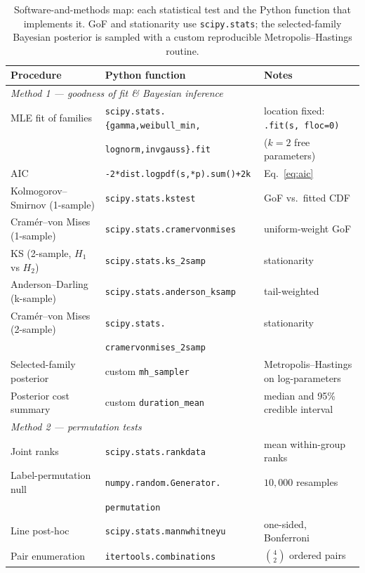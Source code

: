 \documentclass[11pt,a4paper]{article}
\begin{document}
\begin{table}[H]\centering\small\setlength{\tabcolsep}{4pt}
\begin{tabular}{@{}p{3.4cm}p{5.9cm}p{4.8cm}@{}}
\toprule
Procedure & Python function & Notes \\
\midrule
\multicolumn{3}{l}{\textit{Method 1 --- goodness of fit \& Bayesian inference}}\\
MLE fit of families & \texttt{scipy.stats.\{gamma,weibull\_min,} & location fixed: \texttt{.fit(s, floc=0)}\\
                    & \texttt{lognorm,invgauss\}.fit} & ($k=2$ free parameters)\\
AIC                 & \texttt{-2*dist.logpdf(s,*p).sum()+2k} & Eq.~\eqref{eq:aic}\\
Kolmogorov--Smirnov (1-sample) & \texttt{scipy.stats.kstest} & GoF vs.\ fitted CDF\\
Cram\'er--von Mises (1-sample)  & \texttt{scipy.stats.cramervonmises} & uniform-weight GoF\\
KS (2-sample, $H_1$ vs $H_2$)  & \texttt{scipy.stats.ks\_2samp} & stationarity\\
Anderson--Darling (k-sample)   & \texttt{scipy.stats.anderson\_ksamp} & tail-weighted\\
Cram\'er--von Mises (2-sample) & \texttt{scipy.stats.} & stationarity\\
                    & \texttt{cramervonmises\_2samp} & \\
Selected-family posterior      & custom \texttt{mh\_sampler} & Metropolis--Hastings on log-parameters\\
Posterior cost summary         & custom \texttt{duration\_mean} & median and 95\% credible interval\\
\midrule
\multicolumn{3}{l}{\textit{Method 2 --- permutation tests}}\\
Joint ranks            & \texttt{scipy.stats.rankdata} & mean within-group ranks\\
Label-permutation null & \texttt{numpy.random.Generator.} & $10{,}000$ resamples\\
                    & \texttt{permutation} & \\
Line post-hoc          & \texttt{scipy.stats.mannwhitneyu} & one-sided, Bonferroni\\
Pair enumeration       & \texttt{itertools.combinations} & $\binom{4}{2}$ ordered pairs\\
\bottomrule
\end{tabular}
\caption{Software-and-methods map: each statistical test and the Python function
that implements it. GoF and stationarity use \texttt{scipy.stats}; the
selected-family Bayesian posterior is sampled with a custom reproducible
Metropolis--Hastings routine.}
\label{tab:software}
\end{table}
\end{document}
